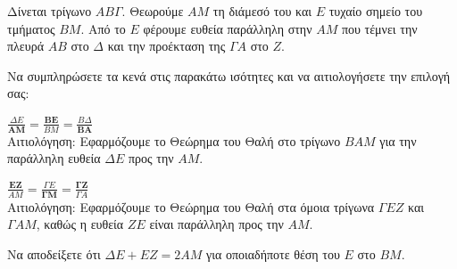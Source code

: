 Δίνεται τρίγωνο $AB\Gamma$. Θεωρούμε $AM$ τη διάμεσό του και $E$ τυχαίο σημείο του τμήματος $BM$. Από το $E$ φέρουμε ευθεία παράλληλη στην $AM$ που τέμνει την πλευρά $AB$ στο $\Delta$ και την προέκταση της $\Gamma A$ στο $Z$.

\begin{alist}
\item Να συμπληρώσετε τα κενά στις παρακάτω ισότητες και να αιτιολογήσετε την επιλογή σας:
    \begin{rlist}
    \item $\frac{\Delta E}{\mathbf{AM}} = \frac{\mathbf{BE}}{BM} = \frac{B\Delta}{\mathbf{BA}}$ \\
    Αιτιολόγηση: Εφαρμόζουμε το Θεώρημα του Θαλή στο τρίγωνο $BAM$ για την παράλληλη ευθεία $\Delta E$ προς την $AM$.
    \item $\frac{\mathbf{EZ}}{AM} = \frac{\Gamma E}{\mathbf{\Gamma M}} = \frac{\mathbf{\Gamma Z}}{\Gamma A}$ \\
    Αιτιολόγηση: Εφαρμόζουμε το Θεώρημα του Θαλή στα όμοια τρίγωνα $\Gamma EZ$ και $\Gamma AM$, καθώς η ευθεία $ZE$ είναι παράλληλη προς την $AM$.
    \end{rlist}
\item Να αποδείξετε ότι $\Delta E + EZ = 2AM$ για οποιαδήποτε θέση του $E$ στο $BM$. 
\end{alist}